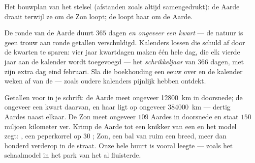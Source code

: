 \begin{omfigure}

{\small Het bouwplan van het stelsel (afstanden zoals altijd
samengedrukt): de Aarde draait terwijl ze om de Zon loopt; de
 loopt haar  om de Aarde.}
\end{omfigure}

\begin{example}\label{ex:g6:sun-earth-moon:leap}
De ronde van de Aarde duurt $365$ dagen \emph{en ongeveer een kwart}
--- de natuur is geen trouw aan ronde getallen verschuldigd. Kalenders
lossen die schuld af door de kwarten te sparen: vier jaar kwartdagen
maken één hele dag, die elk vierde jaar aan de kalender wordt
toegevoegd --- het \emph{schrikkeljaar} van $366$ dagen, met zijn
extra dag eind februari. Sla die boekhouding een eeuw over en de
kalender  weken af van de  --- zoals oudere kalenders
pijnlijk hebben ontdekt.
\end{example}

\begin{example}\label{ex:g6:sun-earth-moon:scale}
Getallen voor in je schrift: de Aarde meet ongeveer \qty{12800}{km} in
doorsnede; de  ongeveer een kwart daarvan, en haar
 ligt op ongeveer \qty{384000}{km} --- dertig Aardes naast
elkaar. De Zon meet ongeveer $109$ Aardes in doorsnede en staat $150$
miljoen kilometer ver. Krimp de Aarde tot een knikker van een
 en het model zegt: , een peperkorrel op $30$
; Zon, een bal van ruim een  breed, meer dan honderd
 verderop in de straat. Onze hele buurt is vooral leegte ---
zoals het schaalmodel in het park van het  al fluisterde.
\end{example}


